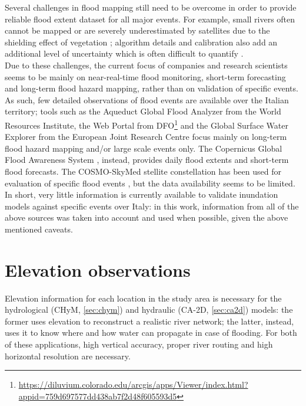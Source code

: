 Several challenges in flood mapping still need to be overcome in order to provide reliable flood extent dataset for all major events. For example, small rivers often cannot be mapped or are severely underestimated by satellites due to the shielding effect of vegetation \citep{SMITH1997}; algorithm details and calibration also add an additional level of uncertainty which is often difficult to quantify \citep{Stephens2012}.\\
Due to these challenges, the current focus of companies and research scientists seems to be mainly on near-real-time flood monitoring, short-term forecasting and long-term flood hazard mapping, rather than on validation of specific events. As such, few detailed observations of flood events are available over the Italian territory; tools such as the Aqueduct Global Flood Analyzer \citep{Luo2015} from the World Resources Institute, the Web Portal from DFO\footnote{\url{https://diluvium.colorado.edu/arcgis/apps/Viewer/index.html?appid=759d697577dd438ab7f2d48f605593d5}} and the Global Surface Water Explorer \citep{Pekel2016} from the European Joint Research Centre focus mainly on long-term flood hazard mapping and/or large scale events only.
The Copernicus Global Flood Awareness System \citep[GLOFAS][]{Alfieri2013}, instead, provides daily flood extents and short-term flood forecasts. The COSMO-SkyMed stellite constellation \citep{Covello2010} has been used for evaluation of specific flood events \citep[see e.g.][]{Refice2014, Pierdicca2013, Pulvirenti2011}, but the data availability seems to be limited. In short, very little information is currently available to validate inundation models against specific events over Italy: in this work, information from all of the above sources was taken into account and used when possible, given the above mentioned caveats.


\section{Elevation observations} \label{sec:DEM}
Elevation information for each location in the study area is necessary for the hydrological (CHyM, \cref{sec:chym}) and hydraulic (CA-2D, \cref{sec:ca2d}) models: the former uses elevation to reconstruct a realistic river network; the latter, instead, uses it to know where and how water can propagate in case of flooding. For both of these applications, high vertical accuracy, proper river routing and high horizontal resolution are necessary.

